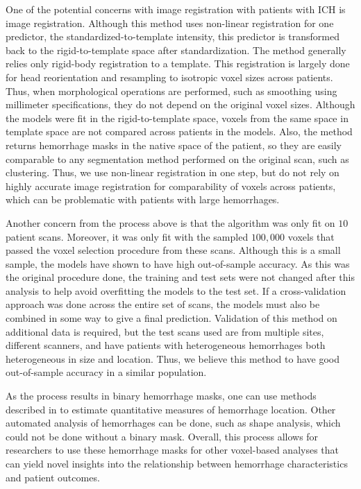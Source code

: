 \documentclass{elsarticle_nonatbib}\usepackage[]{graphicx}\usepackage[]{color}
\begin{document}
One of the potential concerns with image registration with patients with ICH is image registration.  Although this method uses non-linear registration for one predictor, the standardized-to-template intensity, this predictor is transformed back to the rigid-to-template space after standardization.  The method generally relies only rigid-body registration to a template.  This registration is largely done for head reorientation and resampling to isotropic voxel sizes across patients.  Thus, when morphological operations  are performed, such as smoothing using millimeter specifications, they do not depend on the original voxel sizes.  Although the models were fit in the rigid-to-template space, voxels from the same space in template space are not compared across patients in the models.  Also, the method returns hemorrhage masks in the native space of the patient, so they are easily comparable to any segmentation method performed on the original scan, such as clustering.  Thus, we use non-linear registration in one step, but do not rely on highly accurate image registration for comparability of voxels across patients, which can be problematic with patients with large hemorrhages.


Another concern from the process above is that the algorithm was only fit on $10$ patient scans.  Moreover, it was only fit with the sampled $100{,}000$ voxels that passed the voxel selection procedure from these scans.  Although this is a small sample, the models have shown to have high out-of-sample accuracy.  As this was the original procedure done, the training and test sets were not changed after this analysis to help avoid overfitting the models to the test set.  If a cross-validation approach was done across the entire set of scans,  the models must also be combined in some way to give a final prediction.  Validation of this method on additional data is required, but the test scans used are from multiple sites, different scanners, and have patients with heterogeneous hemorrhages both heterogeneous in size and location.  Thus, we believe this method to have good out-of-sample accuracy in a similar population.

As the process results in binary hemorrhage masks, one can use methods described in \citet{muschelli2015quantitative} to estimate quantitative measures of hemorrhage location.  Other automated analysis of hemorrhages can be done, such as shape analysis, which could not be done without a binary mask.  Overall, this process allows for researchers to use these hemorrhage masks for other voxel-based analyses that can yield novel insights into the relationship between hemorrhage characteristics and patient outcomes.
\end{document}
